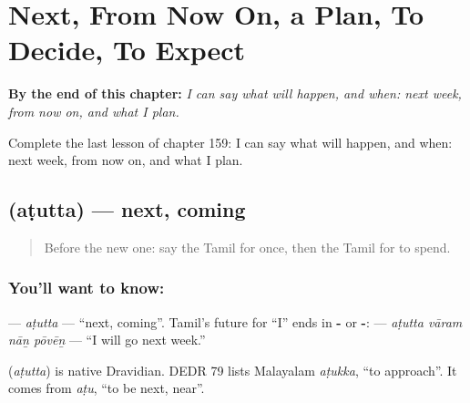
\chapter{Next, From Now On, a Plan, To Decide, To Expect}
\label{ch:ta-next-from-now-on-a-plan-to-decide-to-expect}

\begin{chapteropening}
\textbf{By the end of this chapter:} \emph{I can say what will happen, and when: next week, from now on, and what I plan.}

Complete the last lesson of chapter 159: I can say what will happen, and when: next week, from now on, and what I plan.
\end{chapteropening}

\section[\texorpdfstring{\ta{அடுத்த} (aṭutta)}{அடுத்த (aṭutta)}]{ (aṭutta) — next, coming}

\label{lesson:TA-C159-atutta}



\begin{quote}
Before the new one: say the Tamil for once, then the Tamil for to spend.
\end{quote}

\subsection*{You'll want to know: }
\textbf{} — \emph{aṭutta} — \textquotedblleft{}next, coming\textquotedblright{}. Tamil's future for \textquotedblleft{}I\textquotedblright{} ends in \textbf{-} or \textbf{-}: \textbf{   } — \emph{aṭutta vāram nāṉ pōvēṉ} — \textquotedblleft{}I will go next week.\textquotedblright{}

\begin{cousinweb}
\textbf{} (\emph{aṭutta}) is native Dravidian. DEDR 79 lists Malayalam \emph{aṭukka}, \textquotedblleft{}to approach\textquotedblright{}. It comes from \emph{aṭu}, \textquotedblleft{}to be next, near\textquotedblright{}.
\end{cousinweb}

